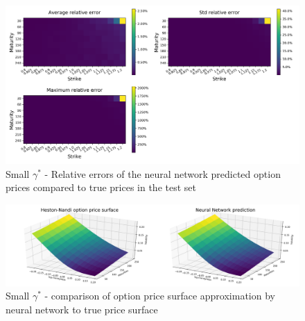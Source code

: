 \documentclass{article}
\begin{document}
\begin{figure}[!ht]
\centering
\includegraphics[width=\textwidth]{Small_g_Price_HNG_NNErrors.png}
\caption{Small $\gamma^*$ - Relative errors of the neural network predicted option prices compared to true prices in the test set}
\label{fig:Small_g_Price_NN_rel_err}
\end{figure}
\begin{figure}[!ht]
\centering
\includegraphics[width=\textwidth]{Small_g_Price_surface.png}
\caption{Small $\gamma^*$ - comparison of option price surface approximation by neural network to true price surface}
\label{fig:Small_g_price_surface}
\end{figure}
\end{document}
